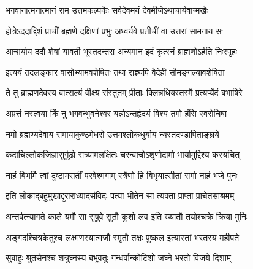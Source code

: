 
\translink{}

\storymeta


\twolineshloka
{भगवानात्मनात्मानं राम उत्तमकल्पकैः}
{सर्वदेवमयं देवमीजेऽथाचार्यवान्मखैः} %

\twolineshloka
{होत्रेऽददाद्दिशं प्राचीं ब्रह्मणे दक्षिणां प्रभुः}
{अध्वर्यवे प्रतीचीं वा उत्तरां सामगाय सः} %

\twolineshloka
{आचार्याय ददौ शेषां यावती भूस्तदन्तरा}
{अन्यमान इदं कृत्स्नं ब्राह्मणोऽर्हति निःस्पृहः} %

\twolineshloka
{इत्ययं तदलङ्कार वासोभ्यामवशेषितः}
{तथा राज्ञ्यपि वैदेही सौमङ्गल्यावशेषिता} %

\twolineshloka
{ते तु ब्राह्मणदेवस्य वात्सल्यं वीक्ष्य संस्तुतम्}
{प्रीताः क्लिन्नधियस्तस्मै प्रत्यर्प्येदं बभाषिरे} %

\twolineshloka
{अप्रत्तं नस्त्वया किं नु भगवन्भुवनेश्वर}
{यन्नोऽन्तर्हृदयं विश्य तमो हंसि स्वरोचिषा} %

\twolineshloka
{नमो ब्रह्मण्यदेवाय रामायाकुण्ठमेधसे}
{उत्तमश्लोकधुर्याय न्यस्तदण्डार्पिताङ्घ्रये} %

\twolineshloka
{कदाचिल्लोकजिज्ञासुर्गूढो रात्र्यामलक्षितः}
{चरन्वाचोऽशृणोद्रामो भार्यामुद्दिश्य कस्यचित्} %

\twolineshloka
{नाहं बिभर्मि त्वां दुष्टामसतीं परवेश्मगाम्}
{स्त्रैणो हि बिभृयात्सीतां रामो नाहं भजे पुनः} %

\twolineshloka
{इति लोकाद्बहुमुखाद्दुराराध्यादसंविदः}
{पत्या भीतेन सा त्यक्ता प्राप्ता प्राचेतसाश्रमम्} %

\twolineshloka
{अन्तर्वत्न्यागते काले यमौ सा सुषुवे सुतौ}
{कुशो लव इति ख्यातौ तयोश्चक्रे क्रिया मुनिः} %

\twolineshloka
{अङ्गदश्चित्रकेतुश्च लक्ष्मणस्यात्मजौ स्मृतौ}
{तक्षः पुष्कल इत्यास्तां भरतस्य महीपते} %

\twolineshloka
{सुबाहुः श्रुतसेनश्च शत्रुघ्नस्य बभूवतुः}
{गन्धर्वान्कोटिशो जघ्ने भरतो विजये दिशाम्} %

